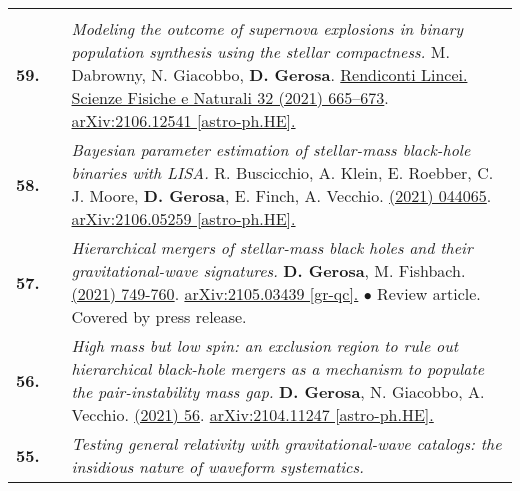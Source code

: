{\begin{longtable}{rp{0.3cm}p{15.8cm}}
\vspace{0.09cm}\\
%
\textbf{59.} & & \textit{Modeling the outcome of supernova explosions in binary population synthesis using the stellar compactness.}
\newline{}
M. Dabrowny, N. Giacobbo, \textbf{D. Gerosa}.
\newline{}
\href{https://link.springer.com/article/10.1007/s12210-021-01019-8}{Rendiconti Lincei. Scienze Fisiche e Naturali 32 (2021) 665–673}. \href{https://arxiv.org/abs/2106.12541}{arXiv:2106.12541 [astro-ph.HE].}
\vspace{0.09cm}\\
%
\textbf{58.} & & \textit{Bayesian parameter estimation of stellar-mass black-hole binaries with LISA.}
\newline{}
R. Buscicchio, A. Klein, E. Roebber, C. J. Moore, \textbf{D. Gerosa}, E. Finch, A. Vecchio.
\newline{}
\href{https://journals.aps.org/prd/abstract/10.1103/PhysRevD.104.044065}{\prd 104 (2021) 044065}. \href{https://arxiv.org/abs/2106.05259}{arXiv:2106.05259 [astro-ph.HE].}
\vspace{0.09cm}\\
%
\textbf{57.} & & \textit{Hierarchical mergers of stellar-mass black holes and their gravitational-wave signatures.}
\newline{}
\textbf{D. Gerosa}, M. Fishbach.
\newline{}
\href{https://www.nature.com/articles/s41550-021-01398-w}{\natastro 5 (2021) 749-760}. \href{https://arxiv.org/abs/2105.03439}{arXiv:2105.03439 [gr-qc].}
\newline{}
\textcolor{color1}{$\bullet$} Review article. Covered by press release.
\vspace{0.09cm}\\
%
\textbf{56.} & & \textit{High mass but low spin: an exclusion region to rule out hierarchical black-hole mergers as a mechanism to populate the pair-instability mass gap.}
\newline{}
\textbf{D. Gerosa}, N. Giacobbo, A. Vecchio.
\newline{}
\href{https://iopscience.iop.org/article/10.3847/1538-4357/ac00bb}{\apj 915 (2021) 56}. \href{https://arxiv.org/abs/2104.11247}{arXiv:2104.11247   [astro-ph.HE].}
\vspace{0.09cm}\\
%
\textbf{55.} & & \textit{Testing general relativity with gravitational-wave catalogs: the insidious nature of waveform systematics.}
\newline{}

\end{longtable}}
